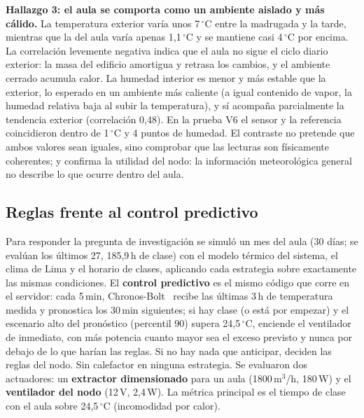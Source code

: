 \documentclass[10pt,a4paper]{article}
\begin{document}
\textbf{Hallazgo 3: el aula se comporta como un ambiente aislado y más cálido.} La temperatura exterior varía unos 7\,$^\circ$C entre la madrugada y la tarde, mientras que la del aula varía apenas 1,1\,$^\circ$C y se mantiene casi 4\,$^\circ$C por encima. La correlación levemente negativa indica que el aula no sigue el ciclo diario exterior: la masa del edificio amortigua y retrasa los cambios, y el ambiente cerrado acumula calor. La humedad interior es menor y más estable que la exterior, lo esperado en un ambiente más caliente (a igual contenido de vapor, la humedad relativa baja al subir la temperatura), y sí acompaña parcialmente la tendencia exterior (correlación 0,48). En la prueba V6 el sensor y la referencia coincidieron dentro de 1\,$^\circ$C y 4 puntos de humedad. El contraste no pretende que ambos valores sean iguales, sino comprobar que las lecturas son físicamente coherentes; y confirma la utilidad del nodo: la información meteorológica general no describe lo que ocurre dentro del aula.

\subsection{Reglas frente al control predictivo}
Para responder la pregunta de investigación se simuló un mes del aula (30 días; se evalúan los últimos 27, 185,9\,h de clase) con el modelo térmico del sistema, el clima de Lima y el horario de clases, aplicando cada estrategia sobre exactamente las mismas condiciones. El \textbf{control predictivo} es el mismo código que corre en el servidor: cada 5\,min, Chronos-Bolt~\cite{chronos} recibe las últimas 3\,h de temperatura medida y pronostica los 30\,min siguientes; si hay clase (o está por empezar) y el escenario alto del pronóstico (percentil 90) supera 24,5\,$^\circ$C, enciende el ventilador de inmediato, con más potencia cuanto mayor sea el exceso previsto y nunca por debajo de lo que harían las reglas. Si no hay nada que anticipar, deciden las reglas del nodo. Sin calefactor en ninguna estrategia. Se evaluaron dos actuadores: un \textbf{extractor dimensionado} para un aula (1800\,m$^3$/h, 180\,W) y el \textbf{ventilador del nodo} (12\,V, 2,4\,W). La métrica principal es el tiempo de clase con el aula sobre 24,5\,$^\circ$C (incomodidad por calor).
\end{document}
